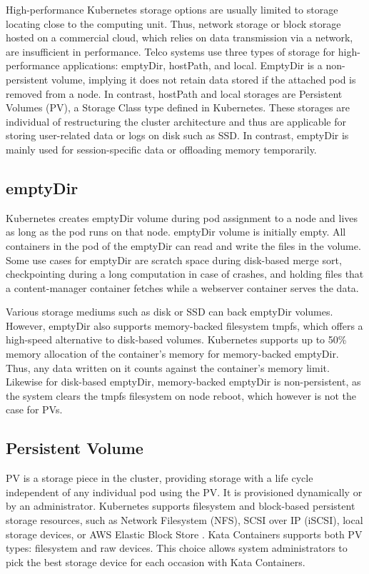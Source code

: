 High-performance Kubernetes storage options are usually limited to storage locating close to the computing unit. Thus, network storage or block storage hosted on a commercial cloud, which relies on data transmission via a network, are insufficient in performance. Telco systems use three types of storage for high-performance applications: emptyDir, hostPath, and local. EmptyDir is a non-persistent volume, implying it does not retain data stored if the attached pod is removed from a node. In contrast, hostPath and local storages are Persistent Volumes (PV), a Storage Class type defined in Kubernetes. These storages are individual of restructuring the cluster architecture and thus are applicable for storing user-related data or logs on disk such as SSD. In contrast, emptyDir is mainly used for session-specific data or offloading memory temporarily.

\subsection{emptyDir}

Kubernetes creates emptyDir volume during pod assignment to a node and lives as long as the pod runs on that node. emptyDir volume is initially empty. All containers in the pod of the emptyDir can read and write the files in the volume. Some use cases for emptyDir are scratch space during disk-based merge sort, checkpointing during a long computation in case of crashes, and holding files that a content-manager container fetches while a webserver container serves the data. \cite{VolumesKubernetes}

Various storage mediums such as disk or SSD can back emptyDir volumes. However, emptyDir also supports memory-backed filesystem tmpfs, which offers a high-speed alternative to disk-based volumes. Kubernetes supports up to 50\% memory allocation of the container's memory for memory-backed emptyDir. Thus, any data written on it counts against the container's memory limit. Likewise for disk-based emptyDir, memory-backed emptyDir is non-persistent, as the system clears the tmpfs filesystem on node reboot, which however is not the case for PVs. \cite{VolumesKubernetes}

\subsection{Persistent Volume}

PV is a storage piece in the cluster, providing storage with a life cycle independent of any individual pod using the PV. It is provisioned dynamically or by an administrator. Kubernetes supports filesystem and block-based persistent storage resources, such as Network Filesystem (NFS), SCSI over IP (iSCSI), local storage devices, or AWS Elastic Block Store \cite{AmazonEBS}. Kata Containers supports both PV types: filesystem and raw devices. This choice allows system administrators to pick the best storage device for each occasion with Kata Containers. \cite{PV}

